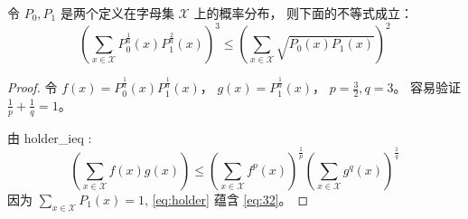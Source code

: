 \begin{lemma}\label{lem:p0p1}
    令 $P_0,P_1$ 
    是两个定义在字母集
    $\mathcal{X}$ 上的概率分布，
    则下面的不等式成立：
    \begin{equation}\label{eq:32}
        \left(\sum_{x\in \mathcal{X}}
        P^{\frac{1}{3}}_0(x)
        P^{\frac{2}{3}}_1(x)\right)^3
        \leq \left(\sum_{x\in \mathcal{X}}
        \sqrt{P_0(x) P_1(x)}\right)^2
    \end{equation}
\end{lemma}

\begin{proof}
    令 $f(x)=P^{\frac{1}{3}}_0(x)
    P^{\frac{1}{3}}_1(x)$，
    $g(x) = P^{\frac{1}{3}}_1(x)$，
    $p=\frac{3}{2}, q=3$。
    容易验证 $\frac{1}{p} + \frac{1}{q}=1$。

    由 \gls{holder_ieq}
    :
    \begin{equation}\label{eq:holder}
        (\sum_{x\in\mathcal{X}}f(x)g(x))\leq (\sum_{x\in\mathcal{X}} f^p(x))^{\frac{1}{p}}
        (\sum_{x\in\mathcal{X}} g^q(x))^{\frac{1}{q}}
    \end{equation}
    因为 $\sum_{x\in\mathcal{X}} P_1(x)=1$, \eqref{eq:holder} 蕴含
    \eqref{eq:32}。
\end{proof}
    
